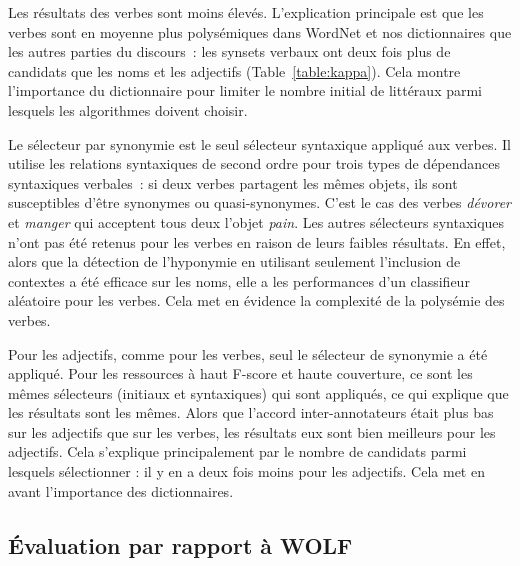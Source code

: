 Les résultats des verbes sont moins élevés. L'explication principale est que
les verbes sont en moyenne plus polysémiques dans WordNet et nos dictionnaires
que les autres parties du discours~: les synsets verbaux ont deux fois plus de
candidats que les noms et les adjectifs (Table~\ref{table:kappa}). Cela montre
l'importance du dictionnaire pour limiter le nombre initial de littéraux parmi
lesquels les algorithmes doivent choisir.

Le sélecteur par synonymie est le seul sélecteur syntaxique appliqué aux
verbes. Il utilise les relations syntaxiques de second ordre pour trois types
de dépendances syntaxiques verbales~: si deux verbes partagent les mêmes
objets, ils sont susceptibles d'être synonymes ou quasi-synonymes. C'est le cas
des verbes \textit{dévorer} et \textit {manger} qui acceptent tous deux l'objet
\textit{pain}. Les autres sélecteurs syntaxiques n'ont pas été retenus pour les
verbes en raison de leurs faibles résultats. En effet, alors que la détection
de l'hyponymie en utilisant seulement l'inclusion de contextes a été efficace
sur les noms, elle a les performances d'un classifieur aléatoire pour les
verbes. Cela met en évidence la complexité de la polysémie des verbes.

Pour les adjectifs, comme pour les verbes, seul le sélecteur de synonymie a été
appliqué. Pour les ressources à haut F-score et haute couverture, ce sont les
mêmes sélecteurs (initiaux et syntaxiques) qui sont appliqués, ce qui explique
que les résultats sont les mêmes. Alors que l'accord inter-annotateurs était
plus bas sur les adjectifs que sur les verbes, les résultats eux sont bien
meilleurs pour les adjectifs. Cela s'explique principalement par le nombre de
candidats parmi lesquels sélectionner : il y en a deux fois moins pour les
adjectifs. Cela met en avant l'importance des dictionnaires.

\subsection{Évaluation par rapport à WOLF}
\label{subsec:vswolf}

